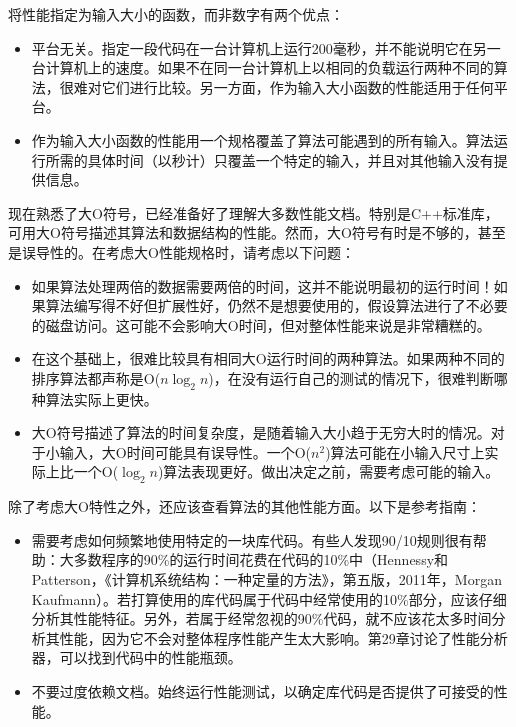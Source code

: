 将性能指定为输入大小的函数，而非数字有两个优点：

\begin{itemize}
\item
平台无关。指定一段代码在一台计算机上运行200毫秒，并不能说明它在另一台计算机上的速度。如果不在同一台计算机上以相同的负载运行两种不同的算法，很难对它们进行比较。另一方面，作为输入大小函数的性能适用于任何平台。

\item
作为输入大小函数的性能用一个规格覆盖了算法可能遇到的所有输入。算法运行所需的具体时间（以秒计）只覆盖一个特定的输入，并且对其他输入没有提供信息。
\end{itemize}


现在熟悉了大O符号，已经准备好了理解大多数性能文档。特别是C++标准库，可用大O符号描述其算法和数据结构的性能。然而，大O符号有时是不够的，甚至是误导性的。在考虑大O性能规格时，请考虑以下问题：

\begin{itemize}
\item
如果算法处理两倍的数据需要两倍的时间，这并不能说明最初的运行时间！如果算法编写得不好但扩展性好，仍然不是想要使用的，假设算法进行了不必要的磁盘访问。这可能不会影响大O时间，但对整体性能来说是非常糟糕的。

\item
在这个基础上，很难比较具有相同大O运行时间的两种算法。如果两种不同的排序算法都声称是O($n \log_2 n$)，在没有运行自己的测试的情况下，很难判断哪种算法实际上更快。

\item
大O符号描述了算法的时间复杂度，是随着输入大小趋于无穷大时的情况。对于小输入，大O时间可能具有误导性。一个O($n^2$)算法可能在小输入尺寸上实际上比一个O($\log_2 n$)算法表现更好。做出决定之前，需要考虑可能的输入。
\end{itemize}

除了考虑大O特性之外，还应该查看算法的其他性能方面。以下是参考指南：

\begin{itemize}
\item
需要考虑如何频繁地使用特定的一块库代码。有些人发现90/10规则很有帮助：大多数程序的90\%的运行时间花费在代码的10\%中（Hennessy和Patterson，《计算机系统结构：一种定量的方法》，第五版，2011年，Morgan Kaufmann）。若打算使用的库代码属于代码中经常使用的10\%部分，应该仔细分析其性能特征。另外，若属于经常忽视的90\%代码，就不应该花太多时间分析其性能，因为它不会对整体程序性能产生太大影响。第29章讨论了性能分析器，可以找到代码中的性能瓶颈。

\item
不要过度依赖文档。始终运行性能测试，以确定库代码是否提供了可接受的性能。
\end{itemize}

